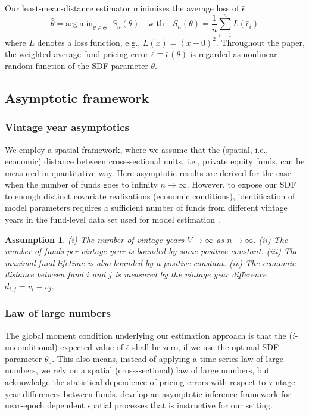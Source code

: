\documentclass[12pt]{article}
\newtheorem{assume}{Assumption}
\begin{document}
Our least-mean-distance estimator minimizes the average loss of $\bar{\epsilon}$
\begin{equation}
\label{eq:estimator}
\hat{\theta} = 
\mathrm{arg \ min}_{\theta \in \Theta}
\enspace
S_n(\theta)
\quad
\mathrm{with}
\quad
S_n(\theta) = 
\frac{1}{n}
\sum_{i=1}^n
L \left( \bar{\epsilon}_{i} \right) 
\end{equation}
where $L$ denotes a loss function, e.g., $L(x)=(x-0)^2$.
Throughout the paper, the weighted average fund pricing error $\bar{\epsilon} \equiv \bar{\epsilon}(\theta)$ is regarded as nonlinear random function of the SDF parameter $\theta$.


\subsection{Asymptotic framework}
\label{sec:asymptotic_framework}

\subsubsection{Vintage year asymptotics}
We employ a spatial framework, where we assume that the (spatial, i.e., economic) distance between cross-sectional units, i.e., private equity funds, can be measured in quantitative way.
Here asymptotic results are derived for the case when the number of funds goes to infinity $n \to \infty$.
However, to expose our SDF to enough distinct covariate realizations (economic conditions), identification of model parameters requires a sufficient number of funds from different vintage years in the fund-level data set used for model estimation \citep{DLP12,KN16}.
\begin{assume}
	(i) The number of vintage years $V \to \infty$ as $n \to \infty$.
	(ii) The number of funds per vintage year is bounded by some positive constant.
	(iii) The maximal fund lifetime is also bounded by a positive constant.
	(iv) The economic distance between fund $i$ and $j$ is measured by the vintage year difference $d_{i,j}=v_i - v_j$.
\end{assume}

\subsubsection{Law of large numbers}
The global moment condition underlying our estimation approach is that the ($i$-unconditional) expected value of $\bar{\epsilon}$ shall be zero, if we use the optimal SDF parameter $\theta_0$. 
This also means, instead of applying a time-series law of large numbers, we rely on a spatial (cross-sectional) law of large numbers, but acknowledge the statistical dependence of  pricing errors with respect to vintage year differences between funds.
\cite{JP12} develop an asymptotic inference framework for near-epoch dependent spatial processes that is instructive for our setting.
\end{document}
